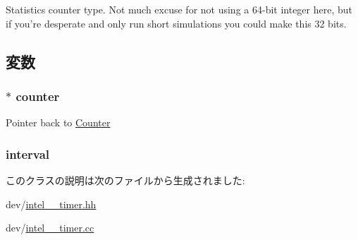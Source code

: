 Statistics counter type. Not much excuse for not using a 64-\/bit integer here, but if you're desperate and only run short simulations you could make this 32 bits. 

\subsection{変数}
\hypertarget{classIntel8254Timer_1_1Counter_1_1CounterEvent_af05ae4262e2f5c2cfb3cbdd872b69c38}{
\subsubsection[{counter}]{$\ast$ {\bf counter}}}
\label{classIntel8254Timer_1_1Counter_1_1CounterEvent_af05ae4262e2f5c2cfb3cbdd872b69c38}
Pointer back to \hyperlink{classIntel8254Timer_1_1Counter}{Counter} \hypertarget{classIntel8254Timer_1_1Counter_1_1CounterEvent_a75c022086cc1012d51fcf693b9539b8f}{
\subsubsection[{interval}]{ interval}}
\label{classIntel8254Timer_1_1Counter_1_1CounterEvent_a75c022086cc1012d51fcf693b9539b8f}


このクラスの説明は次のファイルから生成されました:\begin{DoxyCompactItemize}
\item 
dev/\hyperlink{intel__8254__timer_8hh}{intel\_\_\-timer.hh}\item 
dev/\hyperlink{intel__8254__timer_8cc}{intel\_\_\-timer.cc}\end{DoxyCompactItemize}
